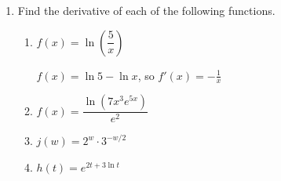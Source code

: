 \documentclass{article}
\begin{document}
\begin{enumerate}
\begin{enumerate}
  \item
    \begin{problem}[\vfill\newpage]
      $2 \log_2 (x+1) - \log_2 (x+2) = -1 $
    \end{problem}

    \begin{solution}
      $x=0$
    \end{solution}

  \end{enumerate}

\item 
  Find the derivative of each of the following functions. 

  \begin{enumerate}

  \item
    \begin{problem}[\stretch{0.25}]
      $f(x)=\ln \left(\dfrac{5}{x} \right)$
    \end{problem}

    \begin{solution}
      $f(x)=\ln5-\ln x$, so $f'(x)=-\frac{1}{x}$
    \end{solution}

  \item
    \begin{problem}[\stretch{0.25}]
      $f(x)= \dfrac{\ln \left(7x^3e^{5x} \right)}{e^2}$
    \end{problem}

  \item
    \begin{problem}[\stretch{0.25}]
      $j(w) = 2^w \cdot 3^{-w/2}$
    \end{problem}

  \item
    \begin{problem}[\stretch{0.25}]
      $h(t) = e^{2t + 3 \ln t}$
    \end{problem}

  \end{enumerate}

\end{enumerate}
\end{document}
